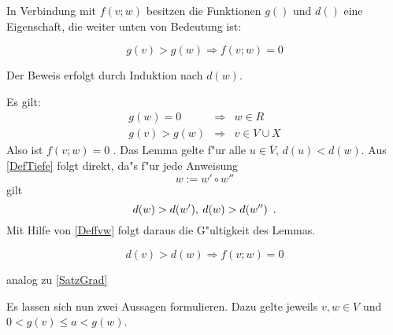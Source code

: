 In Verbindung mit $f(v;w)$ besitzen die Funktionen $g()$ und $d()$ 
eine Eigenschaft, die weiter unten von Bedeutung ist:
\begin{lemma}
\label{SatzGrad}
    \[ g(v) > g(w) \Rightarrow f(v;w) = 0 \]
\end{lemma}
\begin{beweis}
    Der Beweis erfolgt durch Induktion nach $d(w)$.
    \begin{MyDescription}
        Es gilt:
        \begin{eqnarray*}
            g(w) = 0 & \Rightarrow & w \in R \\
            g(v) > g(w) & \Rightarrow & v \in V \cup X 
        \end{eqnarray*}
        Also ist $f(v;w) = 0$ .
        Das Lemma gelte f"ur alle $ u\in\bar{V}, \, d(u)<d(w)$.
        Aus \ref{DefTiefe} folgt direkt, da"s
        f"ur jede Anweisung \[ w:= w' \circ w'' \] gilt 
        \[ d(w) > d(w'), \: d(w) > d(w'') \mbox{\hspace{0.5em}.} \]
        Mit Hilfe von \ref{Deffvw} folgt daraus die G"ultigkeit
        des Lemmas.
    \end{MyDescription}
\end{beweis}

\begin{lemma}
\label{SatzTiefe}
    \[ d(v) > d(w) \Rightarrow f(v;w) = 0 \]
\end{lemma}
\begin{beweis}
    analog zu \ref{SatzGrad}
\end{beweis}

Es lassen sich nun zwei Aussagen formulieren.
Dazu gelte jeweils $v,w \in V$ und $0 < g(v) \leq a < g(w)$.

